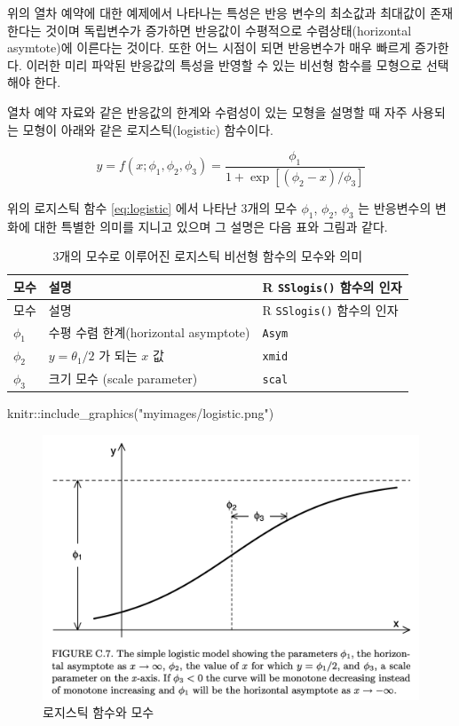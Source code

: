 \documentclass[
  10pt,
]{book}
\newenvironment{Shaded}{\begin{snugshade}}{\end{snugshade}}
\newcommand{\FunctionTok}[1]{\textcolor[rgb]{0.00,0.00,0.00}{#1}}
\newcommand{\NormalTok}[1]{#1}
\newcommand{\SpecialCharTok}[1]{\textcolor[rgb]{0.00,0.00,0.00}{#1}}
\newcommand{\StringTok}[1]{\textcolor[rgb]{0.31,0.60,0.02}{#1}}
\theoremstyle{definition}
\theoremstyle{definition}
\theoremstyle{definition}
\theoremstyle{definition}
\theoremstyle{remark}
\begin{document}
위의 열차 예약에 대한 예제에서 나타나는 특성은 반응 변수의 최소값과 최대값이 존재한다는 것이며
독립변수가 증가하면 반응값이 수평적으로 수렴상태(horizontal asymtote)에 이른다는 것이다. 또한 어느 시점이 되면
반응변수가 매우 빠르게 증가한다. 이러한 미리 파악된 반응값의 특성을 반영할 수 있는 비선형 함수를 모형으로 선택해야 한다.

열차 예약 자료와 같은 반응값의 한계와 수렴성이 있는 모형을 설명할 때 자주 사용되는 모형이 아래와 같은 로지스틱(logistic) 함수이다.

\begin{equation}
 y=f(x; \phi_1, \phi_2, \phi_3) = \frac{\phi_1} {  1+\exp[(\phi_2 -x)/\phi_3]}
\label{eq:logistic} 
\end{equation}

위의 로지스틱 함수 \eqref{eq:logistic} 에서 나타난 3개의 모수 \(\phi_1\), \(\phi_2\), \(\phi_3\) 는
반응변수의 변화에 대한 특별한 의미를 지니고 있으며 그 설명은 다음 표와 그림과 같다.

\begin{longtable}[]{@{}lll@{}}
\caption{\label{tab:logistic} 3개의 모수로 이루어진 로지스틱 비선형 함수의 모수와 의미}\tabularnewline
\toprule
모수 & 설명 & R \texttt{SSlogis()} 함수의 인자\tabularnewline
\midrule
\endfirsthead
\toprule
모수 & 설명 & R \texttt{SSlogis()} 함수의 인자\tabularnewline
\midrule
\endhead
\(\phi_1\) & 수평 수렴 한계(horizontal asymptote) & \texttt{Asym}\tabularnewline
\(\phi_2\) & \(y=\theta_1 /2\) 가 되는 \(x\) 값 & \texttt{xmid}\tabularnewline
\(\phi_3\) & 크기 모수 (scale parameter) & \texttt{scal}\tabularnewline
\bottomrule
\end{longtable}

\begin{Shaded}
\begin{Highlighting}[]
\NormalTok{knitr}\SpecialCharTok{::}\FunctionTok{include\_graphics}\NormalTok{(}\StringTok{"myimages/logistic.png"}\NormalTok{)}
\end{Highlighting}
\end{Shaded}

\begin{figure}

{\centering \includegraphics[width=0.9\linewidth]{myimages/logistic} 

}

\caption{로지스틱 함수와 모수}\label{fig:unnamed-chunk-36}
\end{figure}
\end{document}

